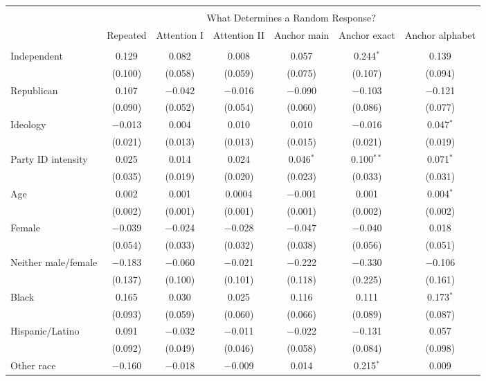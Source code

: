 
\begin{tabular}{@{\extracolsep{5pt}}lcccccc} 
\\[-1.8ex]\hline 
\hline \\[-1.8ex] 
 & \multicolumn{6}{c}{What Determines a Random Response?} \\ 
\cline{2-7} 
 & Repeated & Attention I & Attention II & Anchor main & Anchor exact & Anchor alphabet \\ 
\hline \\[-1.8ex] 
 Independent & 0.129 & 0.082 & 0.008 & 0.057 & 0.244$^{*}$ & 0.139 \\ 
  & (0.100) & (0.058) & (0.059) & (0.075) & (0.107) & (0.094) \\ 
  Republican & 0.107 & $-$0.042 & $-$0.016 & $-$0.090 & $-$0.103 & $-$0.121 \\ 
  & (0.090) & (0.052) & (0.054) & (0.060) & (0.086) & (0.077) \\ 
  Ideology & $-$0.013 & 0.004 & 0.010 & 0.010 & $-$0.016 & 0.047$^{*}$ \\ 
  & (0.021) & (0.013) & (0.013) & (0.015) & (0.021) & (0.019) \\ 
  Party ID intensity & 0.025 & 0.014 & 0.024 & 0.046$^{*}$ & 0.100$^{**}$ & 0.071$^{*}$ \\ 
  & (0.035) & (0.019) & (0.020) & (0.023) & (0.033) & (0.031) \\ 
  Age & 0.002 & 0.001 & 0.0004 & $-$0.001 & 0.001 & 0.004$^{*}$ \\ 
  & (0.002) & (0.001) & (0.001) & (0.001) & (0.002) & (0.002) \\ 
  Female & $-$0.039 & $-$0.024 & $-$0.028 & $-$0.047 & $-$0.040 & 0.018 \\ 
  & (0.054) & (0.033) & (0.032) & (0.038) & (0.056) & (0.051) \\ 
  Neither male/female & $-$0.183 & $-$0.060 & $-$0.021 & $-$0.222 & $-$0.330 & $-$0.106 \\ 
  & (0.137) & (0.100) & (0.101) & (0.118) & (0.225) & (0.161) \\ 
  Black & 0.165 & 0.030 & 0.025 & 0.116 & 0.111 & 0.173$^{*}$ \\ 
  & (0.093) & (0.059) & (0.060) & (0.066) & (0.089) & (0.087) \\ 
  Hispanic/Latino & 0.091 & $-$0.032 & $-$0.011 & $-$0.022 & $-$0.131 & 0.057 \\ 
  & (0.092) & (0.049) & (0.046) & (0.058) & (0.084) & (0.098) \\ 
  Other race & $-$0.160 & $-$0.018 & $-$0.009 & 0.014 & 0.215$^{*}$ & 0.009 \\ 

\end{tabular}
